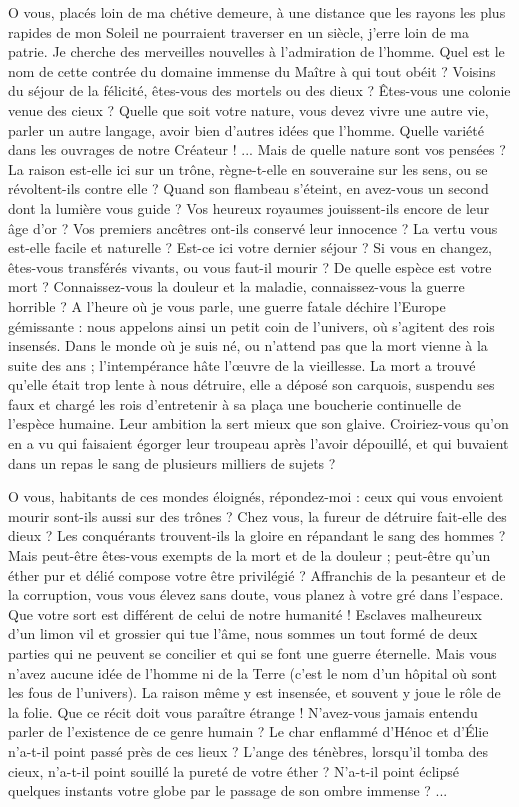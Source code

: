 \documentclass[a4paper, 11pt, oneside, landscape]{article}
\begin{document}
O vous, placés loin de ma chétive demeure, à une distance que les rayons les plus rapides de mon Soleil ne pourraient traverser en un siècle, j'erre loin de ma patrie. Je cherche des merveilles nouvelles à l'admiration de l'homme. Quel est le nom de cette contrée du domaine immense du Maître à qui tout obéit ? Voisins du séjour de la félicité, êtes-vous des mortels ou des dieux ? Êtes-vous une colonie venue des cieux ? Quelle que soit votre nature, vous devez vivre une autre vie, parler un autre langage, avoir bien d'autres idées que l'homme. Quelle variété dans les ouvrages de notre Créateur ! ... Mais de quelle nature sont vos pensées ? La raison est-elle ici sur un trône, règne-t-elle en souveraine sur les sens, ou se révoltent-ils contre elle ? Quand son flambeau s'éteint, en avez-vous un second dont la lumière vous guide ? Vos heureux royaumes jouissent-ils encore de leur âge d'or ? Vos premiers ancêtres ont-ils conservé leur innocence ? La vertu vous est-elle facile et naturelle ? Est-ce ici votre dernier séjour ? Si vous en changez, êtes-vous transférés vivants, ou vous faut-il mourir ? De quelle espèce est votre mort ? Connaissez-vous la douleur et la maladie, connaissez-vous la guerre horrible ? A l'heure où je vous parle, une guerre fatale déchire l'Europe gémissante : nous appelons ainsi un petit coin de l'univers, où s'agitent des rois insensés. Dans le monde où je suis né, ou n'attend pas que la mort vienne à la suite des ans ; l'intempérance hâte l'œuvre de la vieillesse. La mort a trouvé qu'elle était trop lente à nous détruire, elle a déposé son carquois, suspendu ses faux et chargé les rois d'entretenir à sa plaça une boucherie continuelle de l'espèce humaine. Leur ambition la sert mieux que son glaive. Croiriez-vous qu'on en a vu qui faisaient égorger leur troupeau après l'avoir dépouillé, et qui buvaient dans un repas le sang de plusieurs milliers de sujets ?

O vous, habitants de ces mondes éloignés, répondez-moi : ceux qui vous envoient mourir sont-ils aussi sur des trônes ? Chez vous, la fureur de détruire fait-elle des dieux ? Les conquérants trouvent-ils la gloire en répandant le sang des hommes ? Mais peut-être êtes-vous exempts de la mort et de la douleur ; peut-être qu'un éther pur et délié compose votre être privilégié ? Affranchis de la pesanteur et de la corruption, vous vous élevez sans doute, vous planez à votre gré dans l'espace. Que votre sort est différent de celui de notre humanité ! Esclaves malheureux d'un limon vil et grossier qui tue l'âme, nous sommes un tout formé de deux parties qui ne peuvent se concilier et qui se font une guerre éternelle. Mais vous n'avez aucune idée de l'homme ni de la Terre (c'est le nom d'un hôpital où sont les fous de l'univers). La raison même y est insensée, et souvent y joue le rôle de la folie. Que ce récit doit vous paraître étrange ! N'avez-vous jamais entendu parler de l'existence de ce genre humain ? Le char enflammé d'Hénoc et d'Élie n'a-t-il point passé près de ces lieux ? L'ange des ténèbres, lorsqu'il tomba des cieux, n'a-t-il point souillé la pureté de votre éther ? N'a-t-il point éclipsé quelques instants votre globe par le passage de son ombre immense ? ...
\end{document}
